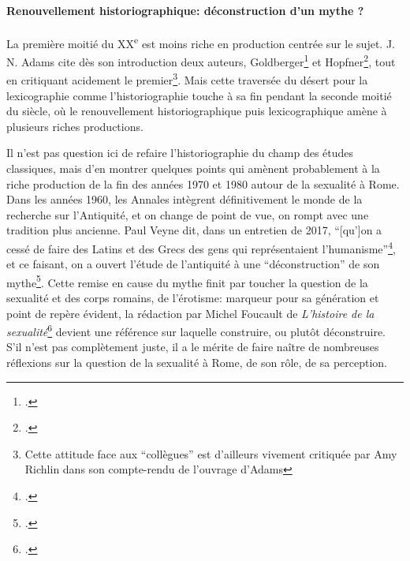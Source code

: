
\paragraph{Renouvellement historiographique: déconstruction d'un mythe ?}

La première moitié du XX\textsuperscript{e} est moins riche en production centrée sur le sujet. J. N. Adams cite dès son introduction deux auteurs, Goldberger\footcite{goldberger_kraftausdrucke_1929, goldberger_kraftausdrucke_1931} et Hopfner\footcite{hopfner_sexualleben_1938}, tout en critiquant acidement le premier\footnote{Cette attitude face aux \enquote{collègues} est d'ailleurs vivement critiquée par Amy Richlin dans son compte-rendu de l'ouvrage d'Adams}. Mais cette traversée du désert pour la lexicographie comme l'historiographie touche à sa fin pendant la seconde moitié du siècle, où le renouvellement historiographique puis lexicographique amène à plusieurs riches productions.

Il n'est pas question ici de refaire l'historiographie du champ des études classiques, mais d'en montrer quelques points qui amènent probablement à la riche production de la fin des années 1970 et 1980 autour de la sexualité à Rome. Dans les années 1960, les Annales intègrent définitivement le monde de la recherche sur l'Antiquité, et on change de point de vue, on rompt avec une tradition plus ancienne. Paul Veyne dit, dans un entretien de 2017, \enquote{[qu']on a cessé de faire des Latins et des Grecs des gens qui représentaient l’humanisme}\footcite{paul_veyne_entretien_2017}, et ce faisant, on a ouvert l'étude de l'antiquité à une \enquote{déconstruction} de son mythe\footcite{dupont_antiquite_2013}. Cette remise en cause du mythe finit par toucher la question de la sexualité et des corps romains, de l'érotisme: marqueur pour sa génération et point de repère évident, la rédaction par Michel Foucault de \textit{L'histoire de la sexualité}\footcite{foucault_histoire_1976} devient une référence sur laquelle construire, ou plutôt déconstruire. S'il n'est pas complètement juste, il a le mérite de faire naître de nombreuses réflexions sur la question de la sexualité à Rome, de son rôle, de sa perception.


